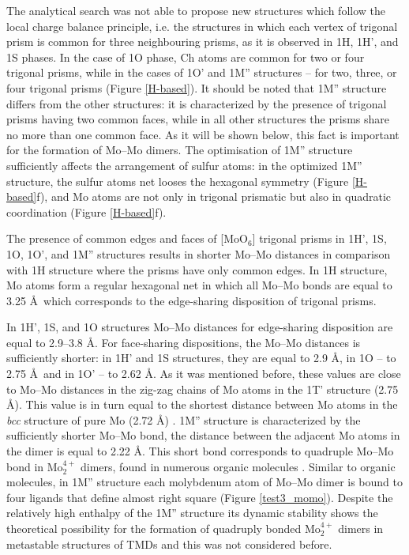 \documentclass[a4paperm]{article}
\begin{document}
The analytical search was not able to propose new structures which follow the local charge balance principle, i.e. the structures in which each vertex of trigonal prism is common for three neighbouring prisms, as it is observed in 1H, 1H', and 1S phases. 
In the case of 1O phase, Ch atoms are common for two or four trigonal prisms, while in the cases of 1O' and 1M'' structures -- for two, three, or four trigonal prisms (Figure \ref{H-based}). 
It should be noted that 1M'' structure differs from the other structures: it is characterized by the presence of trigonal prisms having two common faces, while in all other structures the prisms share no more than one common face.
As it will be shown below, this fact is important for the formation of Mo--Mo dimers.
The optimisation of 1M'' structure sufficiently affects the arrangement of sulfur atoms: in the optimized 1M'' structure, the sulfur atoms net looses the hexagonal symmetry (Figure \ref{H-based}f), and Mo atoms are not only in trigonal prismatic but also in quadratic coordination (Figure \ref{H-based}f).


The presence of common edges and faces of [MoO$_6$] trigonal prisms in 1H', 1S, 1O, 1O', and 1M'' structures results in shorter Mo--Mo distances in comparison with 1H structure where the prisms have only common edges.
In 1H structure, Mo atoms form a regular hexagonal net in which all Mo--Mo bonds are equal to 3.25 \AA\ which corresponds to the edge-sharing disposition of trigonal prisms.

In 1H', 1S, and 1O structures Mo--Mo distances for edge-sharing disposition are equal to 2.9--3.8 \AA.
For face-sharing dispositions, the Mo--Mo distances is sufficiently shorter: in 1H' and 1S structures, they are equal to 2.9 \AA, in 1O -- to 2.75 \AA\ and in 1O' -- to 2.62 \AA.
As it was mentioned before, these values are close to Mo--Mo distances in the zig-zag chains of Mo atoms in the 1T' structure (2.75 \AA).
This value is in turn equal to the shortest distance between Mo atoms in the {\it bcc} structure of pure Mo (2.72 \AA) \cite{MoV}.
1M'' structure is characterized by the sufficiently shorter Mo--Mo bond, the distance between the adjacent Mo atoms in the dimer is equal to 2.22 \AA.
This short bond corresponds to quadruple Mo--Mo bond in Mo$_2^{4+}$ dimers, found in numerous organic molecules \cite{momo}.
Similar to organic molecules, in 1M'' structure  each molybdenum atom of Mo--Mo dimer is bound to four ligands that define almost right square (Figure \ref{test3_momo}).
Despite the relatively high enthalpy of the 1M'' structure its dynamic stability shows the theoretical possibility for the formation of quadruply bonded Mo$_2^{4+}$ dimers in metastable structures of TMDs and this was not considered before.
\end{document}
